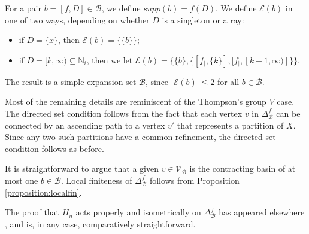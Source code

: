 \documentclass{amsart}
\newtheorem{standing assumption}[theorem]{Standing Assumption}
\begin{document}
For a pair $b = [f,D] \in \mathcal{B}$, we define $supp(b) = f(D)$. We define $\mathcal{E}(b)$ in one of two ways, depending on whether $D$ is  a singleton or a ray:
\begin{itemize}
\item if $D = \{ x \}$, then $\mathcal{E}(b) = \{ \{ b \} \}$;
\item if $D = [k, \infty) \subseteq \mathbb{N}_{i}$, then we let 
$\mathcal{E}(b) = \{ \{ b \}, \{ [f_{\mid}, \{ k \}], [f_{\mid}, [k+1,\infty)] \} \}$.
\end{itemize}
The result is a simple expansion set $\mathcal{B}$, since $|\mathcal{E}(b)| \leq 2$ for all $b \in \mathcal{B}$. 

Most of the remaining details are reminiscent of the Thompson's group $V$ case. The directed set condition
 follows from the fact that each vertex $v$ in $\Delta^{f}_{\mathcal{B}}$ can be connected by an ascending path
to a vertex $v'$ that represents a partition of $X$. Since any two such partitions have a common refinement, the directed set condition follows as before.

It is straightforward to argue that a given $v \in \mathcal{V}_{\mathcal{B}}$ is the contracting basin of at most one
$b \in \mathcal{B}$. Local finiteness of $\Delta^{f}_{\mathcal{B}}$ follows from Proposition 
\ref{proposition:localfin}. 

The proof that $H_{n}$ acts properly and isometrically on $\Delta^{f}_{\mathcal{B}}$ has appeared elsewhere \cite{Farley, FH2}, and is, in any case, comparatively straightforward.








\end{document}
